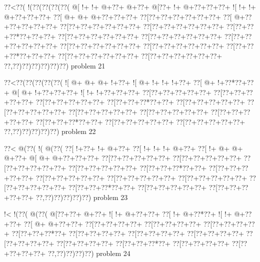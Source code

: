 \vbox{\vbox{\goo
\0??<\0??(\- !(\0??(\0??(\0??(\0??(
\- @[\- !+\- !+\- @+\0??+\- @+\0??+
\- @[\0??+\- !+\- @+\0??+\0??+\0??+
\- ![\- !+\- !+\- @+\0??+\0??+\0??+
\0??[\- @+\- @+\- @+\0??+\0??+\0??+
\0??[\0??+\0??+\0??+\0??+\0??+\0??+
\0??[\- @+\0??+\0??+\0??+\0??+\0??+
\0??[\0??+\0??+\0??+\0??+\0??+\0??+
\0??[\0??+\0??+\0??+\0??+\0??+\0??+
\0??[\0??+\0??+\0??*\0??+\0??+\0??+
\0??[\0??+\0??+\0??+\0??+\0??+\0??+
\0??[\0??+\0??+\0??+\0??+\0??+\0??+
\0??[\0??+\0??+\0??+\0??+\0??+\0??+
\0??[\0??+\0??+\0??+\0??+\0??+\0??+
\0??[\0??+\0??+\0??+\0??+\0??+\0??+
\0??[\0??+\0??+\0??*\0??+\0??+\0??+
\0??[\0??+\0??+\0??+\0??+\0??+\0??+
\0??[\0??+\0??+\0??+\0??+\0??+\0??+
\0??,\0??)\0??)\0??)\0??)\0??)\0??)
}
\hfil problem 21\hfil\break
}

\vbox{\vbox{\goo
\0??<\0??(\0??(\0??(\0??(\0??(
\- ![\- @+\- @+\- @+\- !+\0??+
\- ![\- @+\- !+\- !+\- !+\0??+
\0??[\- @+\- !+\0??*\0??+\0??+
\- @[\- @+\- !+\0??+\0??+\0??+
\- ![\- !+\- !+\0??+\0??+\0??+
\0??[\0??+\0??+\0??+\0??+\0??+
\0??[\0??+\0??+\0??+\0??+\0??+
\0??[\0??+\0??+\0??+\0??+\0??+
\0??[\0??+\0??+\0??*\0??+\0??+
\0??[\0??+\0??+\0??+\0??+\0??+
\0??[\0??+\0??+\0??+\0??+\0??+
\0??[\0??+\0??+\0??+\0??+\0??+
\0??[\0??+\0??+\0??+\0??+\0??+
\0??[\0??+\0??+\0??+\0??+\0??+
\0??[\0??+\0??+\0??*\0??+\0??+
\0??[\0??+\0??+\0??+\0??+\0??+
\0??[\0??+\0??+\0??+\0??+\0??+
\0??,\0??)\0??)\0??)\0??)\0??)
}
\hfil problem 22\hfil\break
}

\vbox{\vbox{\goo
\0??<\- @(\0??(\- !(\- @(\0??(
\0??[\- !+\0??+\- !+\- @+\0??+
\0??[\- !+\- !+\- !+\- @+\0??+
\0??[\- !+\- @+\- @+\- @+\0??+
\- @[\- @+\- @+\0??+\0??+\0??+
\0??[\0??+\0??+\0??+\0??+\0??+
\0??[\0??+\0??+\0??+\0??+\0??+
\0??[\0??+\0??+\0??+\0??+\0??+
\0??[\0??+\0??+\0??+\0??+\0??+
\0??[\0??+\0??+\0??*\0??+\0??+
\0??[\0??+\0??+\0??+\0??+\0??+
\0??[\0??+\0??+\0??+\0??+\0??+
\0??[\0??+\0??+\0??+\0??+\0??+
\0??[\0??+\0??+\0??+\0??+\0??+
\0??[\0??+\0??+\0??+\0??+\0??+
\0??[\0??+\0??+\0??*\0??+\0??+
\0??[\0??+\0??+\0??+\0??+\0??+
\0??[\0??+\0??+\0??+\0??+\0??+
\0??,\0??)\0??)\0??)\0??)\0??)
}
\hfil problem 23\hfil\break
}

\vbox{\vbox{\goo
\- !<\- !(\0??(\- @(\0??(
\- @[\0??+\0??+\- @+\0??+
\- ![\- !+\- @+\0??+\0??+
\0??[\- !+\- @+\0??*\0??+
\- ![\- !+\- @+\0??+\0??+
\0??[\- @+\- @+\0??+\0??+
\0??[\0??+\0??+\0??+\0??+
\0??[\0??+\0??+\0??+\0??+
\0??[\0??+\0??+\0??+\0??+
\0??[\0??+\0??+\0??*\0??+
\0??[\0??+\0??+\0??+\0??+
\0??[\0??+\0??+\0??+\0??+
\0??[\0??+\0??+\0??+\0??+
\0??[\0??+\0??+\0??+\0??+
\0??[\0??+\0??+\0??+\0??+
\0??[\0??+\0??+\0??*\0??+
\0??[\0??+\0??+\0??+\0??+
\0??[\0??+\0??+\0??+\0??+
\0??,\0??)\0??)\0??)\0??)
}
\hfil problem 24\hfil\break
}

